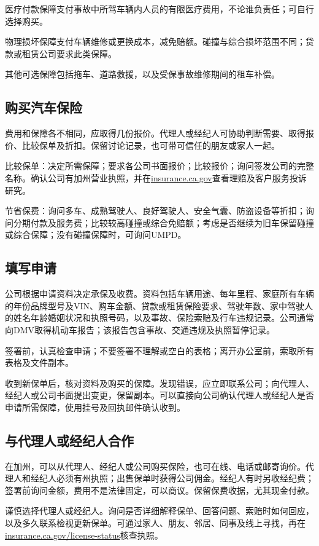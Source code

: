 \documentclass[UTF8,fontset=none,11pt,a4paper]{ctexart}
\begin{document}
医疗付款保障支付事故中所驾车辆内人员的有限医疗费用，不论谁负责任；可自行选择购买。


物理损坏保障支付车辆维修或更换成本，减免赔额。碰撞与综合损坏范围不同；贷款或租赁公司要求此类保障。


其他可选保障包括拖车、道路救援，以及受保事故维修期间的租车补偿。


\subsection*{购买汽车保险}
费用和保障各不相同，应取得几份报价。代理人或经纪人可协助判断需要、取得报价、比较保单及折扣。保留讨论记录，也可带可信任的朋友或家人一起。


比较保单：决定所需保障；要求各公司书面报价；比较报价；询问签发公司的完整名称。确认公司有加州营业执照，并在\url{insurance.ca.gov}查看理赔及客户服务投诉研究。


节省保费：询问多车、成熟驾驶人、良好驾驶人、安全气囊、防盗设备等折扣；询问分期付款及服务费；比较较高碰撞或综合免赔额；考虑是否继续为旧车保留碰撞或综合保障；没有碰撞保障时，可询问UMPD。


\subsection*{填写申请}
公司根据申请资料决定承保及收费。资料包括车辆用途、每年里程、家庭所有车辆的年份品牌型号及VIN、购车金额、贷款或租赁保险要求、驾驶年数、家中驾驶人的姓名年龄婚姻状况和执照号码，以及事故、保险索赔及行车违规记录。公司通常向DMV取得机动车报告；该报告包含事故、交通违规及执照暂停记录。


签署前，认真检查申请；不要签署不理解或空白的表格；离开办公室前，索取所有表格及文件副本。


收到新保单后，核对资料及购买的保障。发现错误，应立即联系公司；向代理人、经纪人或公司书面提出变更，保留副本。可以直接向公司确认代理人或经纪人是否申请所需保障，使用挂号及回执邮件确认收到。


\subsection*{与代理人或经纪人合作}
在加州，可以从代理人、经纪人或公司购买保险，也可在线、电话或邮寄询价。代理人和经纪人必须有州执照；出售保单时获得公司佣金。经纪人有时另收经纪费；签署前询问金额，费用不是法律固定，可以商议。保留保费收据，尤其现金付款。


谨慎选择代理人或经纪人。询问是否详细解释保单、回答问题、索赔时如何回应，以及多久联系检视更新保单。可通过家人、朋友、邻居、同事及线上寻找，再在\url{insurance.ca.gov/license-status}核查执照。
\end{document}
